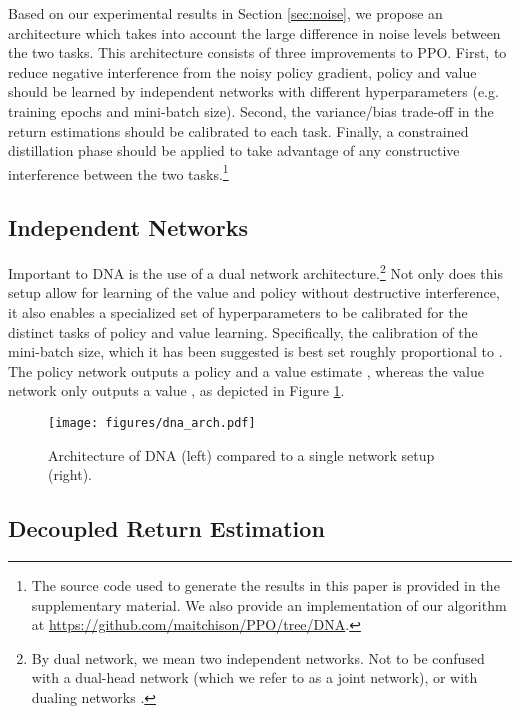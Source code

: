 \documentclass{article}
\begin{document}
Based on our experimental results in Section \ref{sec:noise}, we propose an architecture which takes into account the large difference in noise levels between the two tasks. This architecture consists of three improvements to PPO. First, to reduce negative interference from the noisy policy gradient, policy and value should be learned by independent networks with different hyperparameters (e.g. training epochs and mini-batch size). Second, the variance/bias trade-off in the return estimations should be calibrated to each task. Finally, a constrained distillation phase should be applied to take advantage of any constructive interference between the two tasks.\footnote{The source code used to generate the results in this paper is provided in the supplementary material. We also provide an implementation of our algorithm at \url{https://github.com/maitchison/PPO/tree/DNA}.}

\subsection{Independent Networks}






Important to DNA is the use of a dual network architecture.\footnote{By dual network, we mean two independent networks. Not to be confused with a dual-head network (which we refer to as a joint network), or with dualing networks \cite{wang2016dueling}.} Not only does this setup allow for learning of the value and policy without destructive interference, it also enables a specialized set of hyperparameters to be calibrated for the distinct tasks of policy and value learning. Specifically, the calibration of the mini-batch size, which it has been suggested is best set roughly proportional to  \cite{mccandlish2018empirical}. The policy network outputs a policy  and a value estimate , whereas the value network only outputs a value , as depicted in Figure \ref{fig:dna_arch}.




\begin{figure}[t]
    \centering
    \texttt{[image: figures/dna\_arch.pdf]}
    \caption{Architecture of DNA (left) compared to a single network setup (right).}
    \label{fig:dna_arch}
\end{figure}



\subsection{Decoupled Return Estimation}
\end{document}
